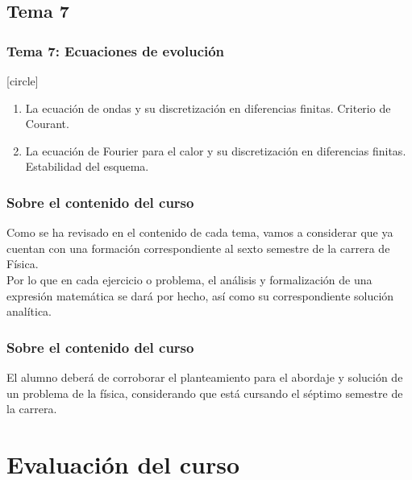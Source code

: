 \documentclass[12pt]{beamer}
\begin{document}
\subsection*{Tema 7}
\begin{frame}
\frametitle{\textbf{Tema 7: Ecuaciones de evolución}}
[circle]
\begin{enumerate}[<+->]
\item La ecuación de ondas y su discretización en diferencias finitas. Criterio de Courant.
\item La ecuación de Fourier para el calor y su discretización en diferencias finitas. Estabilidad del esquema.
\end{enumerate}
\end{frame}
\begin{frame}
\frametitle{Sobre el contenido del curso}
Como se ha revisado en el contenido de cada tema, vamos a considerar que ya cuentan con una formación correspondiente al sexto semestre de la carrera de Física.
\\
\bigskip
\pause
Por lo que en cada ejercicio o problema, el análisis y formalización de una expresión matemática se dará por hecho, así como su correspondiente solución analítica.
\end{frame}
\begin{frame}
\frametitle{Sobre el contenido del curso}
El alumno deberá de corroborar el planteamiento para el abordaje y solución de un problema de la física, considerando que está cursando el séptimo semestre de la carrera.
\end{frame}
\section{Evaluación del curso}
\end{document}
